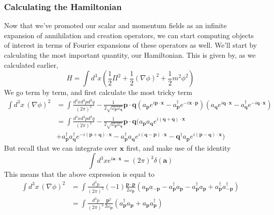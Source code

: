 \documentclass[11pt, oneside]{article}   	%
\theoremstyle{newline}
\theoremstyle{newline}
\theoremstyle{newline}
\theoremstyle{newline}
\theoremstyle{newline}
\newcommand{\freq}[1]{\omega_\mathbf{ #1} }
\begin{document}
\subsubsection{Calculating the Hamiltonian} 
Now that we've promoted our scalar and momentum fields as an infinite expansion of annihilation and creation operators, we can start computing objects of interest in terms of Fourier expansions of these operators as well. We'll start by calculating the most important quantity, our Hamiltonian. This is given by, as we calculated earlier, 
\[ H  = \int d^3 x \left( \frac{1}{2} \Pi^2 + \frac{1}{2} \left( \nabla \phi \right)^2 + \frac{1}{2}m^2 \phi^2  \right) \] 
We go term by term, and first calculate the most tricky term
\begin{align*} 
\int d^3 x \, (\nabla \phi)^2 &= \int \frac{d^3 x d^3 p d^3 q}{(2 \pi )^3 } - \frac{1}{2\sqrt{\omega_\mathbf{p} \omega_\mathbf{q}}} \mathbf{p} \cdot\mathbf{q} \left( a_\mathbf{p} e^{i \mathbf{p} \cdot \mathbf{x}} - a_\mathbf{p}^\dagger e^{-  i \mathbf{x} \cdot \mathbf{p}} \right)\left(a_\mathbf{q}e^{i \mathbf{q} \cdot \mathbf{x}} - a_\mathbf{q}^\dagger e^{ - i \mathbf{q} \cdot \mathbf{x}}\right) \\
& = \int \frac{d^3 x d^3 p d^3 q}{(2 \pi )^3 } - \frac{1}{2\sqrt{\omega_\mathbf{p} \omega_\mathbf{q}}} \mathbf{p} \cdot \mathbf{q} (a_\mathbf{p} a_\mathbf{q} e^{i (\mathbf{q} + \mathbf{q}) \cdot \mathbf{x}} \\
& + a_\mathbf{p}^\dagger a_\mathbf{q}^\dagger e^{ - i (\mathbf{p} + \mathbf{q}) \cdot \mathbf{x}}  - a_\mathbf{p}^\dagger a_\mathbf{q}e^{i ( \mathbf{q} - \mathbf{p}) \cdot \mathbf{x}} - \mathbf{q}^\dagger a_\mathbf{p}e^{i (\mathbf{p} - \mathbf{q}) \cdot \mathbf{x}} ) 
\end{align*} But recall that we can integrate over $\mathbf{x}$ first, and make use of the identity 
\[
\int d^3x e^{i \mathbf{a} \cdot \mathbf{x}} = (2 \pi )^3 \delta ( \mathbf{a})
\]
This means that the above expression is equal to 
\begin{align*}
\int d^3 x \, (\nabla \phi)^2&= \int \frac{d^3 p}{(2 \pi )^3} ( - 1) \frac{\mathbf{p} \cdot \mathbf{p}}{2 \omega_\mathbf{p}} \left( a_\mathbf{p} a_{ - \mathbf{p}}  - a_\mathbf{p}^\dagger a_{\mathbf{p}}  - a_{\mathbf{p}}^\dagger a_\mathbf{p} + a_\mathbf{p}^\dagger a_{ - \mathbf{p}}^\dagger \right) \\
&= \int \frac{d^3 p}{(2 \pi)^3 } \frac{ \mathbf{p}^2}{ 2 \freq{ p } }  \left( a_{\mathbf{p}}^\dagger a_{\mathbf{p}} + a_\mathbf{p} a_\mathbf{p}^\dagger \right)
\end{align*}
\end{document}

